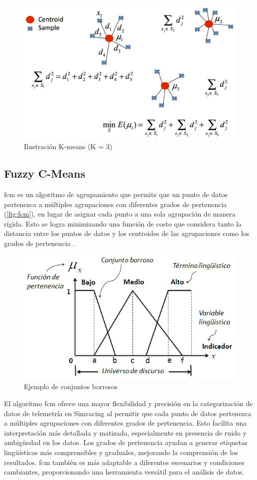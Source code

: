 \begin{figure}[H]
	\centering
	\includegraphics[width=0.6\linewidth]{./figs/aprendizaje_no_supervisado/k_means.png}
	\caption[Ilustración K-means (K = 3)]{Ilustración K-means (K = 3) \cite{UniOviedoKMeans}}
    \label{fig:km}
\end{figure}

\subsection{Fuzzy C-Means}

\ac{fcm} es un algoritmo de agrupamiento que permite que un punto de datos pertenezca a múltiples agrupaciones con diferentes grados de pertenencia (\autoref{fig:fcm}), en lugar de asignar cada punto a una sola agrupación de manera rígida. Esto se logra minimizando una función de costo que considera tanto la distancia entre los puntos de datos y los centroides de las agrupaciones como los grados de pertenencia \cite{Bezdek1981, Hathaway1996, Dunn1973, Pal1995}.

\begin{figure}[H]
	\centering
	\includegraphics[width=0.6\linewidth]{./figs/aprendizaje_no_supervisado/conjuntos_borrosos.png}
	\caption[Ejemplo de conjuntos borrosos]{Ejemplo de conjuntos borrosos \cite{ResearchGateFuzzySets}}
    \label{fig:fcm}
\end{figure}

El algoritmo \ac{fcm} ofrece una mayor flexibilidad y precisión en la categorización de datos de telemetría en Simracing al permitir que cada punto de datos pertenezca a múltiples agrupaciones con diferentes grados de pertenencia. Esto facilita una interpretación más detallada y matizada, especialmente en presencia de ruido y ambigüedad en los datos. Los grados de pertenencia ayudan a generar etiquetas lingüísticas más comprensibles y graduales, mejorando la comprensión de los resultados. \ac{fcm} también es más adaptable a diferentes escenarios y condiciones cambiantes, proporcionando una herramienta versátil para el análisis de datos.
